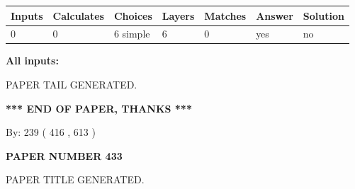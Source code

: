 \documentclass[12pt]{article}
\begin{document}
   
   
   
\noindent\begin{tabular}{|l|l|l|l|l|l|l|}
 \hline
Inputs & Calculates & Choices & Layers & Matches & Answer & Solution \\ \hline
 0  & 
 0  & 
 6
  simple  
  & 
 6  & 
 0  & 
  yes & 
  no 
  \\ \hline
 \end{tabular}
   
   
   
   
\noindent{}
   
   
   
   
\noindent\vspace{0.1in}\hspace{-0.08in} {\textbf{\Large{All inputs: }}}
   
   
   
   
   
   
 \vspace{0.2in}
 
   
   
\vspace{2.0in} PAPER TAIL GENERATED.
   
   
   
   
\vspace{1.0in} 
{\textbf{\large{ *** END OF PAPER, THANKS *** }}} 
   
   
\hspace{1.0in} By: 
 239 ( 416 ,  613 )
   
   
   
   
\newpage 
\setcounter{page}{ 
   433001 } 
   
   
   
   
 {\textbf{ \Large{ PAPER NUMBER  433  }}}
   
   
\vspace{0.2in}
   
   
   
   
   
   
   
   
 \vspace{0.2in}
 
 
 
 
   
   
 PAPER TITLE GENERATED.
   
   
   
\end{document}
